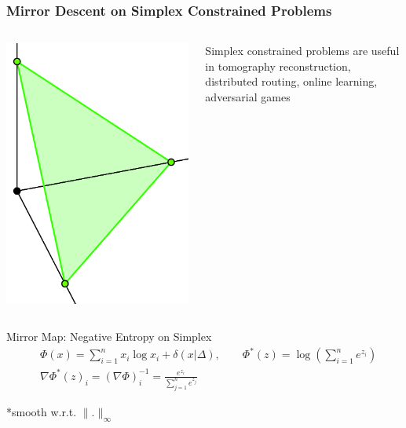 \documentclass{beamer}
\begin{document}
\begin{frame}
\frametitle{Mirror Descent on Simplex Constrained Problems}

\begin{columns}
\begin{column}{0.2\textwidth}
\includegraphics[width=0.8\linewidth]{Images/simplex.png}
\end{column}
\begin{column}{0.8\textwidth}  %
    Simplex constrained problems are useful in tomography reconstruction, distributed routing, online learning, adversarial games
    
\end{column}
\end{columns}
\begin{block}{Mirror Map: Negative Entropy on Simplex}
\begin{align*}
    &\Phi(x) = \sum_{i=1}^n x_i \log x_i + \delta (x|\Delta), \qquad \Phi^*(z) = \log \left(\sum_{i=1}^n e^{z_i} \right)\\
    &\nabla \Phi^*(z)_i = (\nabla \Phi)^{-1}_i = \frac{e^{z_i}}{\sum_{j=1}^ne^{z_j}}
\end{align*}
\end{block}
*smooth w.r.t. $\| . \|_\infty$
\end{frame}
\end{document}
